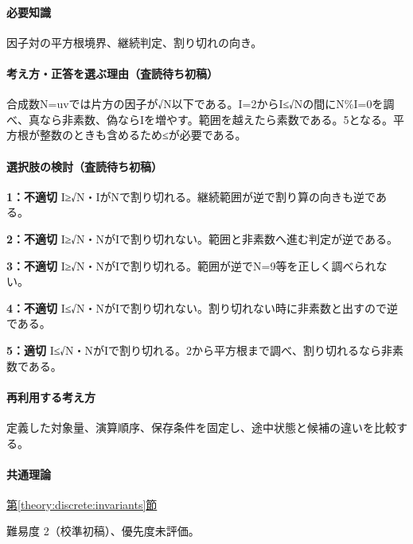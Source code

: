 \paragraph{必要知識} 因子対の平方根境界、継続判定、割り切れの向き。

\paragraph{考え方・正答を選ぶ理由（査読待ち初稿）} 合成数N=\allowbreak{}uvでは片方の因子が√N以下である。I=\allowbreak{}2からI≤√Nの間にN\%I=\allowbreak{}0を調べ、真なら非素数、偽ならIを増やす。範囲を越えたら素数である。5となる。平方根が整数のときも含めるため≤が必要である。

\paragraph{選択肢の検討（査読待ち初稿）}\mbox{}\par

\noindent\textbf{1：不適切} I≥√N・IがNで割り切れる。継続範囲が逆で割り算の向きも逆である。\par

\noindent\textbf{2：不適切} I≥√N・NがIで割り切れない。範囲と非素数へ進む判定が逆である。\par

\noindent\textbf{3：不適切} I≥√N・NがIで割り切れる。範囲が逆でN=\allowbreak{}9等を正しく調べられない。\par

\noindent\textbf{4：不適切} I≤√N・NがIで割り切れない。割り切れない時に非素数と出すので逆である。\par

\noindent\textbf{5：適切} I≤√N・NがIで割り切れる。2から平方根まで調べ、割り切れるなら非素数である。\par

\paragraph{再利用する考え方} 定義した対象量、演算順序、保存条件を固定し、途中状態と候補の違いを比較する。

\paragraph{共通理論} \hyperref[theory:discrete:invariants]{第\ref*{theory:discrete:invariants}節}

\par 難易度 2（校準初稿）、優先度未評価。

